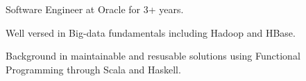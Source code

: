 

\begin{cvparagraph}


Software Engineer at Oracle for 3+ years.

Well versed in Big-data fundamentals including Hadoop and HBase.

Background in maintainable and resusable solutions using Functional Programming through Scala and Haskell.

\end{cvparagraph}
